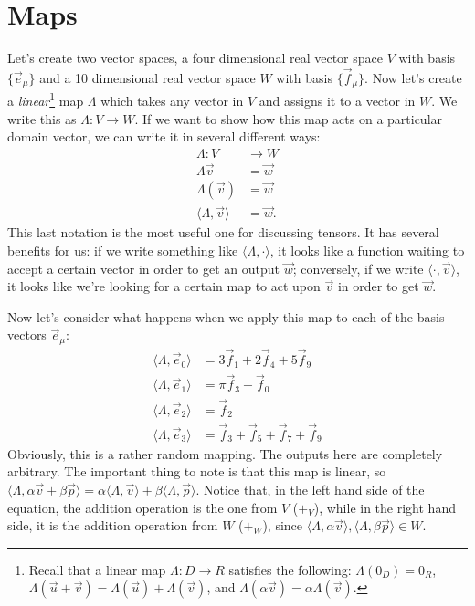 \section{Maps}
Let's create two vector spaces, a four dimensional real vector space $V$ with basis $\{\vec{e}_\mu\}$ and a 10 dimensional real vector space $W$ with basis $\{\vec{f}_\mu\}$.
Now let's create a \emph{linear}\footnote{Recall that a linear map $\Lambda : D \to R$ satisfies the following: $\Lambda(0_D) = 0_R$, $\Lambda(\vec{u} + \vec{v}) = \Lambda(\vec{u}) + \Lambda(\vec{v})$, and $\Lambda(\alpha\vec{v}) = \alpha\Lambda(\vec{v})$.} map $\Lambda$ which takes any vector in $V$ and assigns it to a vector in $W$.
We write this as $\Lambda : V \to W$.
If we want to show how this map acts on a particular domain vector, we can write it in several different ways:
\begin{align*}
    \Lambda : V &\to W \tag{Definition} \\
    \Lambda\vec{v} &= \vec{w} \tag{Operator notation} \\
    \Lambda(\vec{v}) &= \vec{w} \tag{Function notation} \\
    \langle \Lambda,\vec{v} \rangle &= \vec{w}. \tag{Bracket notation}
\end{align*}
This last notation is the most useful one for discussing tensors.
It has several benefits for us: if we write something like $\langle \Lambda, \cdot \rangle$, it looks like a function waiting to accept a certain vector in order to get an output $\vec{w}$; conversely, if we write $\langle \cdot, \vec{v} \rangle$, it looks like we're looking for a certain map to act upon $\vec{v}$ in order to get $\vec{w}$.

Now let's consider what happens when we apply this map to each of the basis vectors $\vec{e}_\mu$:
\begin{align*}
    \langle \Lambda, \vec{e}_0 \rangle &= 3\vec{f}_1 + 2\vec{f}_4 + 5\vec{f}_9 \\
    \langle \Lambda, \vec{e}_1 \rangle &= \pi \vec{f}_3 + \vec{f}_0 \\
    \langle \Lambda, \vec{e}_2 \rangle &= \vec{f}_2 \\
    \langle \Lambda, \vec{e}_3 \rangle &= \vec{f}_3 + \vec{f}_5 + \vec{f}_7 + \vec{f}_9
\end{align*}
Obviously, this is a rather random mapping. The outputs here are completely arbitrary. The important thing to note is that this map is linear, so $\langle \Lambda, \alpha\vec{v} + \beta\vec{p} \rangle = \alpha\langle \Lambda, \vec{v} \rangle + \beta\langle \Lambda, \vec{p} \rangle$. Notice that, in the left hand side of the equation, the addition operation is the one from $V$ ($+_V$), while in the right hand side, it is the addition operation from $W$ ($+_W$), since $\langle \Lambda, \alpha\vec{v} \rangle,\langle \Lambda, \beta\vec{p} \rangle \in W$.

